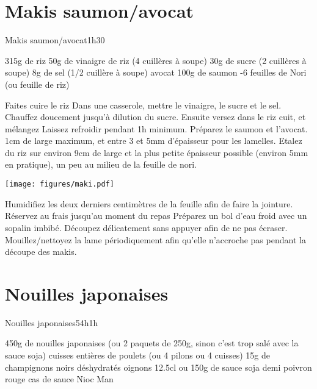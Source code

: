 {\section{Makis saumon/avocat}
\begin{recette}{Makis saumon/avocat}{}{1h30}{}
\begin{ingredients}
\ingredient 315g de riz %
\ingredient 50g de vinaigre de riz (4 cuillères à soupe)
\ingredient 30g de sucre (2 cuillères à soupe)
\ingredient 8g de sel (1/2 cuillère à soupe)
 avocat
\ingredient 100g de saumon
-6 feuilles de Nori (ou feuille de riz)
\end{ingredients}

\begin{preparation}
\etape Faites cuire le riz
\etape Dans une casserole, mettre le vinaigre, le sucre et le sel. Chauffez doucement jusqu'à dilution du sucre.
\etape Ensuite versez dans le riz cuit, et mélangez
\etape Laissez refroidir pendant 1h minimum.
\etape Préparez le saumon et l'avocat. 1cm de large maximum, et entre 3 et 5mm d'épaisseur pour les lamelles. 
\etape Etalez du riz sur environ 9cm de large et la plus petite épaisseur possible (environ 5mm en pratique), un peu au milieu de la feuille de nori. 
\begin{center}
\texttt{[image: figures/maki.pdf]}
\end{center}
\etape Humidifiez les deux derniers centimètres de la feuille afin de faire la jointure.
\etape Réservez au frais jusqu'au moment du repas
\etape Préparez un bol d'eau froid avec un sopalin imbibé. Découpez délicatement sans appuyer afin de ne pas écraser. Mouillez/nettoyez la lame périodiquement afin qu'elle n'accroche pas pendant la découpe des makis.  
\end{preparation}
\end{recette}

\section{Nouilles japonaises}
\begin{recette}{Nouilles japonaises}{5}{4h}{1h}
\begin{ingredients}
\ingredient 450g de nouilles japonaises (ou 2 paquets de 250g, sinon c'est trop salé avec la sauce soja)
 cuisses entières de poulets (ou 4 pilons ou 4 cuisses)
\ingredient 15g de champignons noirs déshydratés
 oignons
\ingredient 12.5cl ou 150g de sauce soja 
 demi poivron rouge
 cas de sauce Nioc Man
\end{ingredients}


\end{recette}}
